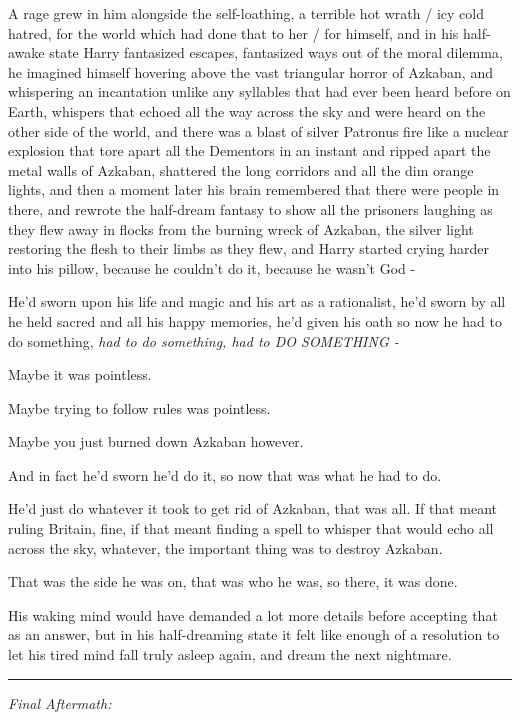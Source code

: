 A rage grew in him alongside the self-loathing, a terrible hot wrath / icy cold hatred, for the world which had done that to her / for himself, and in his half-awake state Harry fantasized escapes, fantasized ways out of the moral dilemma, he imagined himself hovering above the vast triangular horror of Azkaban, and whispering an incantation unlike any syllables that had ever been heard before on Earth, whispers that echoed all the way across the sky and were heard on the other side of the world, and there was a blast of silver Patronus fire like a nuclear explosion that tore apart all the Dementors in an instant and ripped apart the metal walls of Azkaban, shattered the long corridors and all the dim orange lights, and then a moment later his brain remembered that there were people in there, and rewrote the half-dream fantasy to show all the prisoners laughing as they flew away in flocks from the burning wreck of Azkaban, the silver light restoring the flesh to their limbs as they flew, and Harry started crying harder into his pillow, because he couldn't do it, because he wasn't God -

He'd sworn upon his life and magic and his art as a rationalist, he'd sworn by all he held sacred and all his happy memories, he'd given his oath so now he had to do something, \emph{had to do something, had to DO SOMETHING -}

Maybe it was pointless.

Maybe trying to follow rules was pointless.

Maybe you just burned down Azkaban however.

And in fact he'd sworn he'd do it, so now that was what he had to do.

He'd just do whatever it took to get rid of Azkaban, that was all. If that meant ruling Britain, fine, if that meant finding a spell to whisper that would echo all across the sky, whatever, the important thing was to destroy Azkaban.

That was the side he was on, that was who he was, so there, it was done.

His waking mind would have demanded a lot more details before accepting that as an answer, but in his half-dreaming state it felt like enough of a resolution to let his tired mind fall truly asleep again, and dream the next nightmare.

\begin{center}\rule{3in}{0.4pt}\end{center}

\emph{Final Aftermath:}

